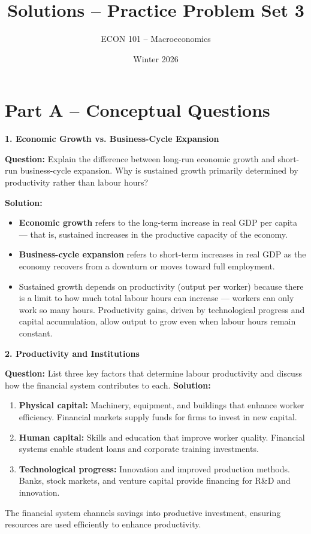 \documentclass[12pt]{article}
\title{Solutions -- Practice Problem Set 3}
\author{ECON 101 -- Macroeconomics}
\date{Winter 2026}
\begin{document}
\maketitle


\section*{Part A – Conceptual Questions}

\textbf{1. Economic Growth vs. Business-Cycle Expansion}

\textbf{Question:}  
Explain the difference between long-run economic growth and short-run business-cycle expansion. Why is sustained growth primarily determined by productivity rather than labour hours?

\textbf{Solution:}  
\begin{itemize}
\item \textbf{Economic growth} refers to the long-term increase in real GDP per capita — that is, sustained increases in the productive capacity of the economy.
\item \textbf{Business-cycle expansion} refers to short-term increases in real GDP as the economy recovers from a downturn or moves toward full employment.
\item Sustained growth depends on productivity (output per worker) because there is a limit to how much total labour hours can increase — workers can only work so many hours. Productivity gains, driven by technological progress and capital accumulation, allow output to grow even when labour hours remain constant.
\end{itemize}



\textbf{2. Productivity and Institutions}

\textbf{Question:}  
List three key factors that determine labour productivity and discuss how the financial system contributes to each.
\newpage
\textbf{Solution:}  
\begin{enumerate}
    \item \textbf{Physical capital:} Machinery, equipment, and buildings that enhance worker efficiency. Financial markets supply funds for firms to invest in new capital.
    \item \textbf{Human capital:} Skills and education that improve worker quality. Financial systems enable student loans and corporate training investments.
    \item \textbf{Technological progress:} Innovation and improved production methods. Banks, stock markets, and venture capital provide financing for R\&D and innovation.
\end{enumerate}
The financial system channels savings into productive investment, ensuring resources are used efficiently to enhance productivity.
\end{document}
